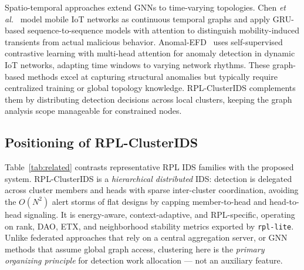 Spatio-temporal approaches extend GNNs to time-varying topologies.
Chen \textit{et al.}~\cite{spatiotemporal2026} model mobile IoT networks as continuous temporal graphs and apply GRU-based sequence-to-sequence models with attention to distinguish mobility-induced transients from actual malicious behavior.
Anomal-EFD~\cite{anomalefd2026} uses self-supervised contrastive learning with multi-head attention for anomaly detection in dynamic IoT networks, adapting time windows to varying network rhythms.
These graph-based methods excel at capturing structural anomalies but typically require centralized training or global topology knowledge. RPL-ClusterIDS complements them by distributing detection decisions across local clusters, keeping the graph analysis scope manageable for constrained nodes.

\subsection{Positioning of RPL-ClusterIDS}
Table~\ref{tab:related} contrasts representative RPL IDS families with the proposed system.
RPL-ClusterIDS is a \emph{hierarchical distributed} IDS: detection is delegated across cluster members and heads with sparse inter-cluster coordination, avoiding the $O(N^2)$ alert storms of flat designs by capping member-to-head and head-to-head signaling.
It is energy-aware, context-adaptive, and RPL-specific, operating on rank, DAO, ETX, and neighborhood stability metrics exported by \texttt{rpl-lite}.
Unlike federated approaches that rely on a central aggregation server, or GNN methods that assume global graph access, clustering here is the \emph{primary organizing principle} for detection work allocation --- not an auxiliary feature.

